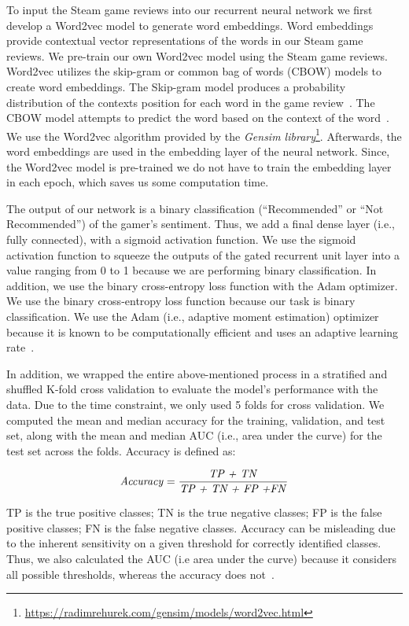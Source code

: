 \documentclass[conference]{IEEEtran}
\begin{document}
To input the Steam game reviews into our recurrent neural network we first develop a Word2vec model to  generate word embeddings. Word embeddings provide contextual vector representations of the words in our Steam game reviews. We pre-train our own Word2vec model using the Steam game reviews. Word2vec utilizes the skip-gram or common bag of words (CBOW) models to create word embeddings. The Skip-gram model produces a probability distribution of the contexts position for each word in the game review~\cite{mikolov2013distributed}. The CBOW model attempts to predict the word based on the context of the word~\cite{ling2015two}. We use the Word2vec algorithm provided by the \textit{Gensim library}\footnote{\url{https://radimrehurek.com/gensim/models/word2vec.html}}. Afterwards, the word embeddings are used in the embedding layer of the neural network. Since, the Word2vec model is pre-trained we do not have to train the embedding layer in each epoch, which saves us some computation time.


The output of our network is a binary classification (``Recommended'' or ``Not Recommended'') of the gamer's sentiment. Thus, we add a final dense layer (i.e., fully connected), with a sigmoid activation function. We use the sigmoid activation function to squeeze the outputs of the gated recurrent unit layer into a value ranging from 0 to 1 because we are performing binary classification. In addition, we use the binary cross-entropy loss function with the Adam optimizer. We use the binary cross-entropy loss function because our task is binary classification. We use the Adam (i.e., adaptive moment estimation) optimizer because it is known to be computationally efficient and uses an adaptive learning rate~\cite{kingma2014adam}.


In addition, we wrapped the entire above-mentioned process in a stratified and shuffled K-fold cross validation to evaluate the model's performance with the data. Due to the time constraint, we only used 5 folds for cross validation. We computed the mean and median accuracy for the training, validation, and test set, along with the mean and median AUC (i.e., area under the curve) for the test set across the folds. Accuracy is defined as:

\[\text{\emph{Accuracy}} = \frac{\text{\emph{TP + TN}}}{\text{\emph{TP + TN + FP +FN}}}\]


TP is the true positive classes; TN is the true negative classes; FP is the false positive classes; FN is the false negative classes. Accuracy can be misleading due to the inherent sensitivity on a given threshold for correctly identified classes. Thus, we also calculated the AUC (i.e area under the curve) because it considers all possible thresholds, whereas the accuracy does not~\cite{ling2003auc}.
\end{document}

